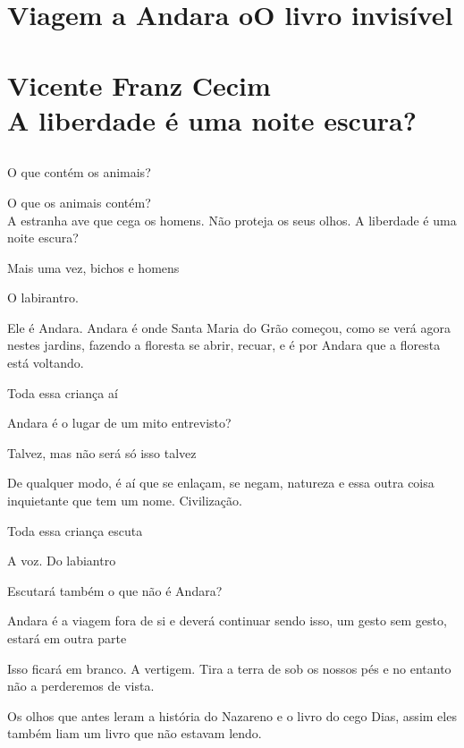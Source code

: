 \part*{Viagem a Andara oO livro invisível\\
\bigskip
\bigskip
\bigskip
\bigskip
{}\\
\Large{Vicente Franz Cecim}\\
\bigskip
\bigskip
\normalsize{A liberdade é uma noite escura?}}

\chapter*{}

\forceindent{}O que contém os animais?

O que os animais contém?\\

A estranha ave que cega os homens. Não proteja os seus olhos. A liberdade é uma noite escura?

Mais uma vez, bichos e homens

\pagebreak

O labirantro.

Ele é Andara. Andara é onde Santa Maria do Grão começou, como se verá
agora nestes jardins, fazendo a floresta se abrir, recuar, e é por
Andara que a floresta está voltando.

Toda essa criança aí

Andara é o lugar de um mito entrevisto?

Talvez, mas não será só isso talvez

De qualquer modo, é aí que se enlaçam, se negam, natureza e essa outra
coisa inquietante que tem um nome. Civilização.

Toda essa criança escuta

A voz. Do labiantro

\pagebreak

Escutará também o que não é Andara?

Andara é a viagem fora de si e deverá continuar sendo isso, um gesto sem
gesto, estará em outra parte

Isso ficará em branco. A vertigem. Tira a terra de sob os nossos pés e
no entanto não a perderemos de vista.

Os olhos que antes leram a história do Nazareno e o livro do cego Dias,
assim eles também liam um livro que não estavam lendo.

